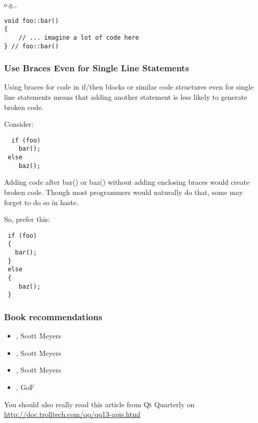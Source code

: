 e.g.,

\begin{verbatim}
void foo::bar()
{ 
    // ... imagine a lot of code here 
} // foo::bar()
\end{verbatim}

\hypertarget{toc27}{}
\subsubsection{Use Braces Even for Single Line Statements}
Using braces for code in if/then blocks or similar code structures even for
single line statements means that adding another statement is less likely to
generate broken code.

Consider:

\begin{verbatim}
  if (foo)
    bar();
 else
    baz();
\end{verbatim}

Adding code after bar() or baz() without adding enclosing braces would create
broken code.  Though most programmers would naturally do that, some may forget
to do so in haste.

So, prefer this:

\begin{verbatim}
 if (foo)
 {
   bar();
 }
 else
 { 
    baz();
 } 
\end{verbatim}

\hypertarget{toc28}{}
\subsubsection{Book recommendations}
\begin{itemize}
\item {}, Scott Meyers
\item {}, Scott Meyers
\item {}, Scott Meyers
\item {}, GoF
\end{itemize}


You should also really read this article from Qt Quarterly on \\
\url{http://doc.trolltech.com/qq/qq13-apis.html}


